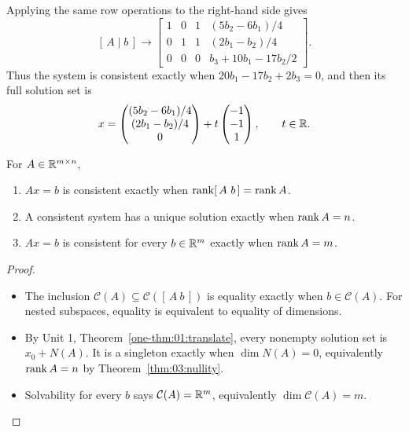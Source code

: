 \begin{example}
Applying the same row operations to the right-hand side gives
\[
[\,A\mid b\,]\longrightarrow
\left[\begin{array}{ccc|c}
1&0&1&(5b_2-6b_1)/4\\
0&1&1&(2b_1-b_2)/4\\
0&0&0&b_3+10b_1-17b_2/2
\end{array}\right].
\]
Thus the system is consistent exactly when
\(20b_1-17b_2+2b_3=0\), and then its full solution set is
\[
x=\begin{pmatrix}(5b_2-6b_1)/4\\(2b_1-b_2)/4\\0\end{pmatrix}
+t\begin{pmatrix}-1\\-1\\1\end{pmatrix},\qquad t\in\mathbb R.
\]
\end{example}

\begin{proposition}\label{prop:03:consistent}
For \(A\in\mathbb R^{m\times n}\),
\begin{enumerate}
\item \(Ax=b\) is consistent exactly when \(\rank[\,A\ b\,]=\rank A\).
\item A consistent system has a unique solution exactly when \(\operatorname{rank} A=n\).
\item \(Ax=b\) is consistent for every \(b\in\mathbb R^m\) exactly when \(\operatorname{rank} A=m\).
\end{enumerate}
\end{proposition}
\begin{proof}
\begin{itemize}
\item The inclusion \(\mathcal C(A)\subseteq\mathcal C([\,A\ b\,])\)
is equality exactly when \(b\in\mathcal C(A)\).
For nested subspaces, equality is equivalent to equality of dimensions.
\item By Unit 1, Theorem~\ref{one-thm:01:translate}, every nonempty solution
set is \(x_0+N(A)\). It is a singleton exactly when \(\dim N(A)=0\),
equivalently \(\operatorname{rank} A=n\) by Theorem~\ref{thm:03:nullity}.
\item Solvability for every \(b\) says \(\mathcal C(A)=\mathbb R^m\),
equivalently \(\dim\mathcal C(A)=m\).
\end{itemize}
\end{proof}
